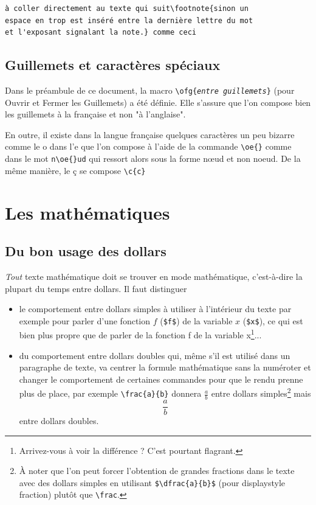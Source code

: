 \documentclass[12pt,a4paper]{article}
\newenvironment{code}{%
\begin{mdframed}[linecolor=Green,innerrightmargin=30pt,innerleftmargin=30pt,
backgroundcolor=Black!5,
skipabove=10pt,skipbelow=10pt,roundcorner=5pt,
splitbottomskip=6pt,splittopskip=12pt]
}{%
\end{mdframed}
}
\newcommand{\ofg}[1]{\og{}#1\fg{}}
\newcommand{\cmd}[1]{\texttt{\textbackslash#1}}
\newcommand{\cmdone}[2]{\cmd{#1\{\emph{#2}\}}}
\begin{document}
\begin{code}
\begin{verbatim}
à coller directement au texte qui suit\footnote{sinon un 
espace en trop est inséré entre la dernière lettre du mot 
et l'exposant signalant la note.} comme ceci
\end{verbatim}
\end{code}

\subsection{Guillemets et caractères spéciaux}

Dans le préambule de ce document, la macro \cmdone{ofg}{entre guillemets} (pour \ofg{Ouvrir et Fermer les Guillemets}) a été définie. Elle s'assure que l'on compose bien les guillemets \ofg{à la française} et non "à l'anglaise".

En outre, il existe dans la langue française quelques caractères un peu bizarre comme le \ofg{o dans l'e} que l'on compose à l'aide de la commande \cmd{oe\{\}} comme dans le mot \verb|n\oe{}ud| qui ressort alors sous la forme \ofg{n\oe{}ud} et non \ofg{noeud}. De la même manière, le \c{c} se compose \verb|\c{c}|

\section{Les mathématiques}

\subsection{Du bon usage des dollars}

\emph{Tout} texte mathématique doit se trouver en \ofg{mode mathématique}, c'est-à-dire la plupart du temps entre dollars. Il faut distinguer 
	\begin{itemize}
    	\item le comportement entre dollars simples à utiliser à l'intérieur du texte par exemple pour parler d'une fonction $f$ (\verb|$f$|) de la variable $x$ (\verb|$x$|), ce qui est bien plus propre que de parler de la fonction f de la variable x\footnote{Arrivez-vous à voir la différence ? C'est pourtant flagrant.}...
        \item du comportement entre dollars doubles qui, même s'il est utilisé dans un paragraphe de texte, va centrer la formule mathématique sans la numéroter et changer le comportement de certaines commandes pour que le rendu prenne plus de place, par exemple \verb|\frac{a}{b}| donnera $\frac{a}{b}$ 
        entre dollars simples\footnote{À noter que l'on peut forcer l'obtention de \ofg{grandes} fractions dans le texte avec des dollars simples en utilisant 
        \texttt{\$}\cmd{dfrac\{a\}\{b\}\$}
        (pour \ofg{displaystyle fraction}) plutôt que \cmd{frac}.} 
        mais $$\frac{a}{b}$$ entre dollars doubles.
    \end{itemize}
\end{document}

